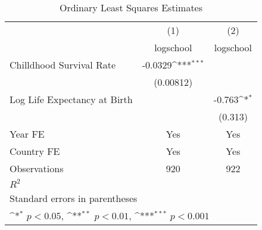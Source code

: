 \begin{table}[htbp]\centering
\def\sym#1{\ifmmode^{#1}\else\(^{#1}\)\fi}
\caption{Ordinary Least Squares Estimates}
\begin{tabular}{l*{2}{c}}
\toprule
                &\multicolumn{1}{c}{(1)}&\multicolumn{1}{c}{(2)}\\
                &\multicolumn{1}{c}{logschool}&\multicolumn{1}{c}{logschool}\\
\midrule
Chilldhood Survival Rate&  -0.0329\sym{***}&                  \\
                &(0.00812)         &                  \\
\addlinespace
Log Life Expectancy at Birth&                  &   -0.763\sym{*}  \\
                &                  &  (0.313)         \\
\addlinespace
Year FE         &      Yes         &      Yes         \\
\addlinespace
Country FE      &      Yes         &      Yes         \\
\midrule
Observations    &      920         &      922         \\
\(R^{2}\)       &                  &                  \\
\bottomrule
\multicolumn{3}{l}{\footnotesize Standard errors in parentheses}\\
\multicolumn{3}{l}{\footnotesize \sym{*} \(p<0.05\), \sym{**} \(p<0.01\), \sym{***} \(p<0.001\)}\\
\end{tabular}
\end{table}
